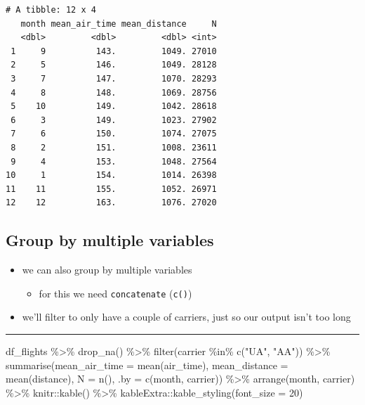 \documentclass[
  letterpaper,
  DIV=11]{scrartcl}
\newenvironment{Shaded}{\begin{snugshade}}{\end{snugshade}}
\newcommand{\AttributeTok}[1]{\textcolor[rgb]{0.40,0.45,0.13}{#1}}
\newcommand{\DecValTok}[1]{\textcolor[rgb]{0.68,0.00,0.00}{#1}}
\newcommand{\FunctionTok}[1]{\textcolor[rgb]{0.28,0.35,0.67}{#1}}
\newcommand{\NormalTok}[1]{\textcolor[rgb]{0.00,0.23,0.31}{#1}}
\newcommand{\SpecialCharTok}[1]{\textcolor[rgb]{0.37,0.37,0.37}{#1}}
\newcommand{\StringTok}[1]{\textcolor[rgb]{0.13,0.47,0.30}{#1}}
\providecommand{\tightlist}{%
  \setlength{\itemsep}{0pt}\setlength{\parskip}{0pt}}\usepackage{longtable,booktabs,array}
\begin{document}
\begin{verbatim}
# A tibble: 12 x 4
   month mean_air_time mean_distance     N
   <dbl>         <dbl>         <dbl> <int>
 1     9          143.         1049. 27010
 2     5          146.         1049. 28128
 3     7          147.         1070. 28293
 4     8          148.         1069. 28756
 5    10          149.         1042. 28618
 6     3          149.         1023. 27902
 7     6          150.         1074. 27075
 8     2          151.         1008. 23611
 9     4          153.         1048. 27564
10     1          154.         1014. 26398
11    11          155.         1052. 26971
12    12          163.         1076. 27020
\end{verbatim}

\hypertarget{group-by-multiple-variables}{%
\subsection{Group by multiple
variables}\label{group-by-multiple-variables}}

\begin{itemize}
\tightlist
\item
  we can also group by multiple variables

  \begin{itemize}
  \tightlist
  \item
    for this we need \texttt{concatenate} (\texttt{c()})
  \end{itemize}
\item
  we'll filter to only have a couple of carriers, just so our output
  isn't too long
\end{itemize}

\begin{center}\rule{0.5\linewidth}{0.5pt}\end{center}

\begin{Shaded}
\begin{Highlighting}[numbers=left,,]
\NormalTok{df\_flights }\SpecialCharTok{\%\textgreater{}\%} 
  \FunctionTok{drop\_na}\NormalTok{() }\SpecialCharTok{\%\textgreater{}\%}
  \FunctionTok{filter}\NormalTok{(carrier }\SpecialCharTok{\%in\%} \FunctionTok{c}\NormalTok{(}\StringTok{"UA"}\NormalTok{, }\StringTok{"AA"}\NormalTok{)) }\SpecialCharTok{\%\textgreater{}\%} 
  \FunctionTok{summarise}\NormalTok{(}\AttributeTok{mean\_air\_time =} \FunctionTok{mean}\NormalTok{(air\_time),}
            \AttributeTok{mean\_distance =} \FunctionTok{mean}\NormalTok{(distance),}
            \AttributeTok{N =} \FunctionTok{n}\NormalTok{(),}
            \AttributeTok{.by =} \FunctionTok{c}\NormalTok{(month, carrier)) }\SpecialCharTok{\%\textgreater{}\%} 
  \FunctionTok{arrange}\NormalTok{(month, carrier) }\SpecialCharTok{\%\textgreater{}\%} 
\NormalTok{  knitr}\SpecialCharTok{::}\FunctionTok{kable}\NormalTok{() }\SpecialCharTok{\%\textgreater{}\%} 
\NormalTok{  kableExtra}\SpecialCharTok{::}\FunctionTok{kable\_styling}\NormalTok{(}\AttributeTok{font\_size =} \DecValTok{20}\NormalTok{)}
\end{Highlighting}
\end{Shaded}
\end{document}
